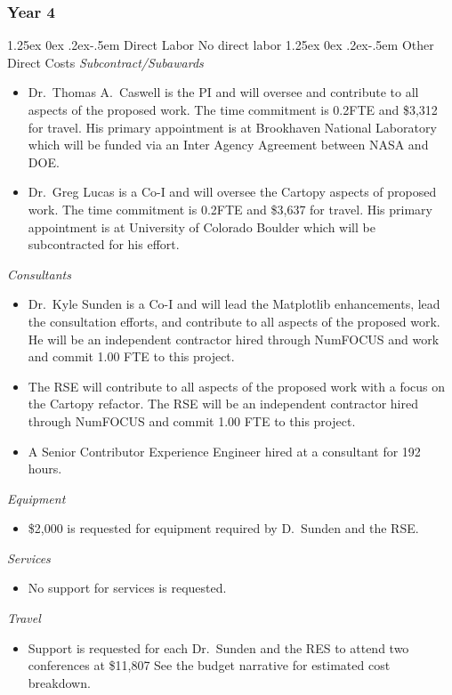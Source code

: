 \documentclass[12pt]{article}
\makeatletter
\numberwithin{page}{section}
\renewcommand{\paragraph}{%
  \@startsection{paragraph}{4}%
  {\z@}{1.25ex \@plus 0ex \@minus .2ex}{-.5em}%
  {\normalfont\normalsize\itshape\bfseries}%
}
\makeatother
\begin{document}
\subsubsection{Year 4}
\paragraph{Direct Labor}
No direct labor
\paragraph{Other Direct Costs}
\textit{Subcontract/Subawards}
\begin{itemize}
  \item Dr.\ Thomas A.\ Caswell is the PI and will oversee and contribute to
    all aspects of the proposed work.  The time commitment is 0.2FTE and \$3,312
    for travel.  His primary appointment is at Brookhaven National Laboratory
    which will be funded via an Inter Agency Agreement between NASA and DOE.
\item Dr.\ Greg Lucas is a Co-I and will oversee the Cartopy aspects of
  proposed work.  The time commitment is 0.2FTE and \$3,637 for travel.  His
  primary appointment is at University of Colorado Boulder which will be
  subcontracted for his effort.
\end{itemize}
\textit{Consultants}
\begin{itemize}
  \item Dr.\ Kyle Sunden is a Co-I and will lead the Matplotlib enhancements,
    lead the consultation efforts, and contribute to all aspects of the
    proposed work.  He will be an independent contractor hired through NumFOCUS and work and commit
    1.00 FTE to this project.
  \item The RSE will contribute to all aspects of the proposed work with a
    focus on the Cartopy refactor.  The RSE will be an independent contractor hired
    through NumFOCUS and commit 1.00 FTE to this project.
  \item A Senior Contributor Experience Engineer hired at a consultant for 192 hours.

\end{itemize}
\textit{Equipment}
\begin{itemize}
\item \$2,000 is requested for equipment required by D.\ Sunden and the RSE.
\end{itemize}
\textit{Services}
\begin{itemize}
\item No support for services is requested.
\end{itemize}
\textit{Travel}
\begin{itemize}
\item Support is requested for each Dr.\ Sunden and the RES to attend two conferences at
  \$11,807  See the budget narrative for estimated cost  breakdown.
\end{itemize}
\end{document}
